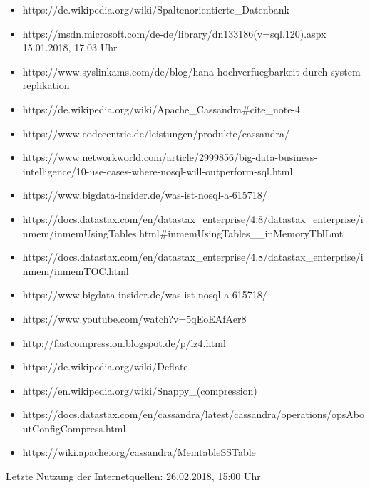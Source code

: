 \documentclass[a4paper, 12pt]{scrartcl}
\begin{document}
\begin{description}
\begin{itemize}
		\item https://de.wikipedia.org/wiki/Spaltenorientierte_Datenbank
		\item https://msdn.microsoft.com/de-de/library/dn133186(v=sql.120).aspx 15.01.2018, 17.03 Uhr
		\item https://www.syslinkams.com/de/blog/hana-hochverfuegbarkeit-durch-system-replikation
		\item https://de.wikipedia.org/wiki/Apache_Cassandra\#cite_note-4
		\item https://www.codecentric.de/leistungen/produkte/cassandra/
		\item https://www.networkworld.com/article/2999856/big-data-business-intelligence/10-use-cases-where-nosql-will-outperform-sql.html
 		\item https://www.bigdata-insider.de/was-ist-nosql-a-615718/
		\item https://docs.datastax.com/en/datastax_enterprise/4.8/datastax_enterprise/inmem/inmemUsingTables.html\#inmemUsingTables__inMemoryTblLmt
		\item https://docs.datastax.com/en/datastax_enterprise/4.8/datastax_enterprise/inmem/inmemTOC.html
		\item https://www.bigdata-insider.de/was-ist-nosql-a-615718/
		\item https://www.youtube.com/watch?v=5qEoEAfAer8
		\item http://fastcompression.blogspot.de/p/lz4.html
		\item https://de.wikipedia.org/wiki/Deflate
		\item https://en.wikipedia.org/wiki/Snappy_(compression)
		\item https://docs.datastax.com/en/cassandra/latest/cassandra/operations/opsAboutConfigCompress.html
		\item https://wiki.apache.org/cassandra/MemtableSSTable
	\end{itemize}
\end{description}
Letzte Nutzung der Internetquellen: 26.02.2018, 15:00 Uhr
	
\end{document}
